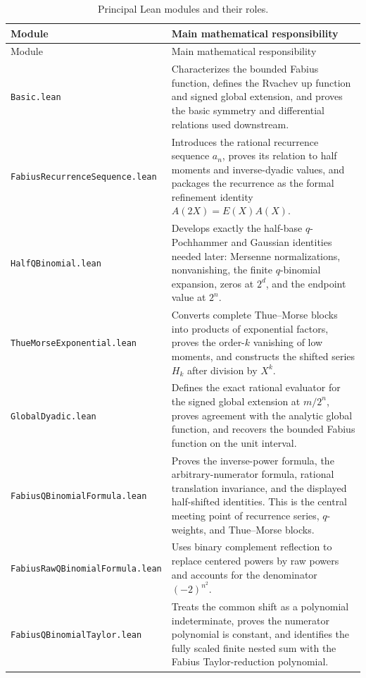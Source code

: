 \documentclass[11pt,oneside]{article}
\theoremstyle{definition}
\theoremstyle{remark}
\begin{document}
\begin{longtable}{@{}L{0.37\textwidth}L{0.56\textwidth}@{}}
\caption{Principal Lean modules and their roles.}\label{tab:leanmodules}\\
\toprule
Module & Main mathematical responsibility\\
\midrule
\endfirsthead
\toprule
Module & Main mathematical responsibility\\
\midrule
\endhead
\texttt{Basic.lean}
& Characterizes the bounded Fabius function, defines the Rvachev up function
and signed global extension, and proves the basic symmetry and differential
relations used downstream.\\[0.35em]
\texttt{FabiusRecurrenceSequence.lean}
& Introduces the rational recurrence sequence $a_n$, proves its relation to
half moments and inverse-dyadic values, and packages the recurrence as the
formal refinement identity $A(2X)=E(X)A(X)$.\\[0.35em]
\texttt{HalfQBinomial.lean}
& Develops exactly the half-base $q$-Pochhammer and Gaussian identities
needed later: Mersenne normalizations, nonvanishing, the finite
$q$-binomial expansion, zeros at $2^d$, and the endpoint value at $2^n$.\\[0.35em]
\texttt{ThueMorseExponential.lean}
& Converts complete Thue--Morse blocks into products of exponential factors,
proves the order-$k$ vanishing of low moments, and constructs the shifted
series $H_k$ after division by $X^k$.\\[0.35em]
\texttt{GlobalDyadic.lean}
& Defines the exact rational evaluator for the signed global extension at
$m/2^n$, proves agreement with the analytic global function, and recovers the
bounded Fabius function on the unit interval.\\[0.35em]
\texttt{FabiusQBinomialFormula.lean}
& Proves the inverse-power formula, the arbitrary-numerator formula, rational
translation invariance, and the displayed half-shifted identities.  This is
the central meeting point of recurrence series, $q$-weights, and Thue--Morse
blocks.\\[0.35em]
\texttt{FabiusRawQBinomialFormula.lean}
& Uses binary complement reflection to replace centered powers by raw powers
and accounts for the denominator $(-2)^{n^2}$.\\[0.35em]
\texttt{FabiusQBinomialTaylor.lean}
& Treats the common shift as a polynomial indeterminate, proves the numerator
polynomial is constant, and identifies the fully scaled finite nested sum
with the Fabius Taylor-reduction polynomial.\\[0.35em]

\end{longtable}
\end{document}
